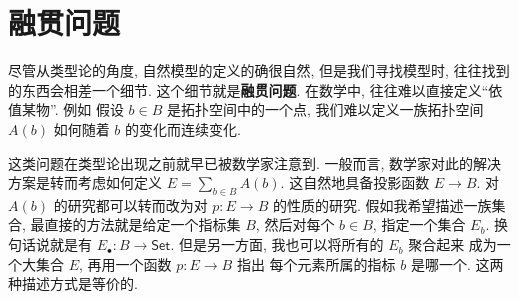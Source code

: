 


\section{融贯问题}

尽管从类型论的角度, 自然模型的定义的确很自然,
但是我们寻找模型时, 往往找到的东西会相差一个细节.
这个细节就是\textbf{融贯问题}.
在数学中, 往往难以直接定义“依值某物”. 例如
假设 \(b \in B\) 是拓扑空间中的一个点,
我们难以定义一族拓扑空间 \(A(b)\) 如何随着 \(b\)
的变化而连续变化.

这类问题在类型论出现之前就早已被数学家注意到.
一般而言, 数学家对此的解决方案是转而考虑如何定义
\(E = \sum_{b \in B} A(b)\).
这自然地具备投影函数 \(E \to B\).
对 \(A(b)\) 的研究都可以转而改为对 \(p : E \to B\) 的性质的研究.
假如我希望描述一族集合, 最直接的方法就是给定一个指标集 \(B\),
然后对每个 \(b \in B\), 指定一个集合 \(E_b\).
换句话说就是有 \(E_\bullet : B \to \mathsf{Set}\).
但是另一方面, 我也可以将所有的 \(E_b\) 聚合起来
成为一个大集合 \(E\), 再用一个函数 \(p : E \to B\) 指出
每个元素所属的指标 \(b\) 是哪一个. 这两种描述方式是等价的.

\begin{center}
\end{center}

